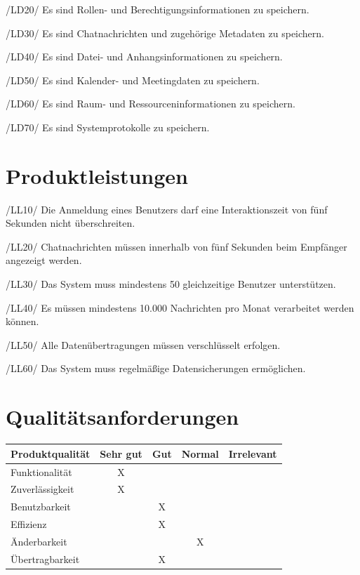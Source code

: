 \documentclass[12pt,a4paper]{extarticle}
\begin{document}
/LD20/ Es sind Rollen- und Berechtigungsinformationen zu speichern.  

/LD30/ Es sind Chatnachrichten und zugehörige Metadaten zu speichern.  

/LD40/ Es sind Datei- und Anhangsinformationen zu speichern.  

/LD50/ Es sind Kalender- und Meetingdaten zu speichern.  

/LD60/ Es sind Raum- und Ressourceninformationen zu speichern.  

/LD70/ Es sind Systemprotokolle zu speichern.  

\section{Produktleistungen}

/LL10/ Die Anmeldung eines Benutzers darf eine Interaktionszeit von fünf Sekunden nicht überschreiten.  

/LL20/ Chatnachrichten müssen innerhalb von fünf Sekunden beim Empfänger angezeigt werden.  

/LL30/ Das System muss mindestens 50 gleichzeitige Benutzer unterstützen.  

/LL40/ Es müssen mindestens 10.000 Nachrichten pro Monat verarbeitet werden können.  

/LL50/ Alle Datenübertragungen müssen verschlüsselt erfolgen.  

/LL60/ Das System muss regelmäßige Datensicherungen ermöglichen.  

\section{Qualitätsanforderungen}

\begin{center}
  \begin{tabular}{|l|c|c|c|c|}
\hline
Produktqualität & Sehr gut & Gut & Normal & Irrelevant \\ \hline
Funktionalität & X & & & \\ \hline
Zuverlässigkeit & X & & & \\ \hline
Benutzbarkeit & & X & & \\ \hline
Effizienz & & X & & \\ \hline
Änderbarkeit & & & X & \\ \hline
Übertragbarkeit & & X & & \\ \hline
\end{tabular}  
\end{center}
\end{document}
